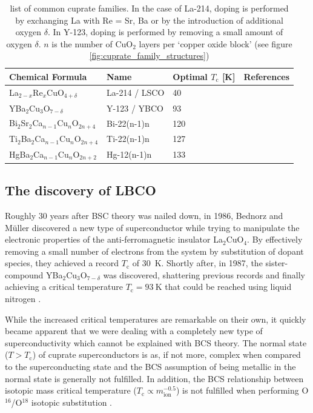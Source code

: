 \begin{table}
    \caption[table of cuprates]{list of common cuprate families. In the case of La-214, doping is performed by exchanging La with Re = Sr, Ba or by the introduction of additional oxygen $\delta$. In Y-123, doping is performed by removing a small amount of oxygen $\delta$. $n$ is the number of CuO$_2$ layers per `copper oxide block' (see figure \ref{fig:cuprate_family_structures})}
    \label{tab:cuprates}
    \centering
    \begin{tabular}{llll}
        \toprule
        Chemical Formula          & Name        & Optimal $T_\text{c}$ [K] & References  \\ \midrule
        La$_{2-x}$Re$_x$CuO$_{4+\delta}$        & La-214 / LSCO     & 40         & \cite{Bednorz1986}  \\
        YBa$_2$Cu$_3$O$_{7-\delta}$               & Y-123 / YBCO      & 93         & \cite{Wu1987}   \\
        Bi$_2$Sr$_2$Ca$_{n-1}$Cu$_n$O$_{2n+4}$ & Bi-22(n-1)n & 120        & \cite{Hazen1988}  \\
        Ti$_2$Ba$_2$Ca$_{n-1}$Cu$_n$O$_{2n+4}$ & Ti-22(n-1)n & 127        & \cite{Sheng1988, Hazen1988a, Parkin1988, Kaneko1991} \\
        HgBa$_2$Ca$_{n-1}$Cu$_n$O$_{2n+2}$  & Hg-12(n-1)n & 133        & \cite{Putilin1993, Schilling1993} \\ \bottomrule
    \end{tabular}
\end{table}

\subsection{The discovery of LBCO}
Roughly 30 years after BSC theory was nailed down, in 1986, Bednorz and M\"uller discovered a new type of superconductor while trying to manipulate the electronic properties of the anti-ferromagnetic insulator La$_2$CuO$_4$. By effectively removing a small number of electrons from the system by substitution of dopant species, they achieved a record $T_\text{c}$ of \SI{30}{\kelvin}. Shortly after, in 1987, the sister-compound YBa$_2$Cu$_3$O$_{7-\delta}$ was discovered, shattering previous records and finally achieving a critical temperature $T_\text{c} = \SI{93}{\kelvin}$ that could be reached using liquid nitrogen \cite{Wu1987}.

While the increased critical temperatures are remarkable on their own, it quickly became apparent that we were dealing with a completely new type of superconductivity which cannot be explained with BCS theory. The normal state ($T > T_\text{c}$) of cuprate superconductors is as, if not more, complex when compared to the superconducting state and the BCS assumption of being metallic in the normal state is generally not fulfilled. In addition, the BCS relationship between isotopic mass critical temperature ($T_\text{c} \propto m_\text{ion}^{-0.5}$) is not fulfilled when performing O$^{16}$/O$^{18}$ isotopic substitution \cite{Suryadijaya2005}.

